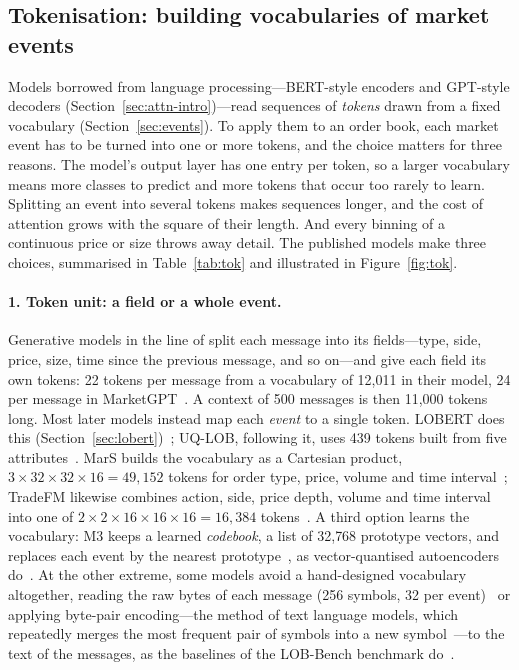 \subsection{Tokenisation: building vocabularies of market events}
\label{sec:deep-tok}

Models borrowed from language processing---BERT-style encoders and GPT-style decoders
(Section~\ref{sec:attn-intro})---read sequences of \emph{tokens} drawn from a fixed vocabulary
(Section~\ref{sec:events}). To apply them to an order book, each market event has to be turned into one or more tokens,
and the choice matters for three reasons. The model's output layer has one entry per token, so a larger vocabulary
means more classes to predict and more tokens that occur too rarely to learn. Splitting an event into several tokens
makes sequences longer, and the cost of attention grows with the square of their length. And every binning of a
continuous price or size throws away detail. The published models make three choices, summarised in
Table~\ref{tab:tok} and illustrated in Figure~\ref{fig:tok}.

\paragraph{1. Token unit: a field or a whole event.} Generative models in the line of
\citet{nagy2023} split each message into its fields---type, side, price, size, time since the previous
message, and so on---and give each field its own tokens: 22 tokens per message from a vocabulary of 12{,}011
in their model, 24 per message in MarketGPT~\citep{wheeler2024marketgpt}. A context of 500 messages is then
11{,}000 tokens long. Most later models instead map each \emph{event} to a single token. LOBERT does this
(Section~\ref{sec:lobert})~\citep{linna2025lobert}; UQ-LOB, following it, uses 439 tokens built from
five attributes~\citep{manoharan2026uqlob}. MarS builds the vocabulary as a Cartesian product, $3 \times 32
\times 32 \times 16 = 49{,}152$ tokens for order type, price, volume and time interval~\citep{li2025mars};
TradeFM likewise combines action, side, price depth, volume and time interval into one of $2 \times 2 \times
16 \times 16 \times 16 = 16{,}384$ tokens~\citep{tradefm2026}. A third option learns the vocabulary: M3 keeps a learned \emph{codebook}, a list of 32{,}768 prototype vectors, and
replaces each event by the nearest prototype~\citep{m3lob}, as vector-quantised autoencoders do~\citep{vandenoord2017vqvae}.
At the other extreme, some models avoid a hand-designed vocabulary altogether, reading the raw bytes of each message
(256 symbols, 32 per event)~\citep{li2025bytegen} or applying byte-pair encoding---the method of text language models,
which repeatedly merges the most frequent pair of symbols into a new symbol~\citep{sennrich2016bpe}---to the text of the
messages, as the baselines of the LOB-Bench benchmark do~\citep{lobbench2025}.

